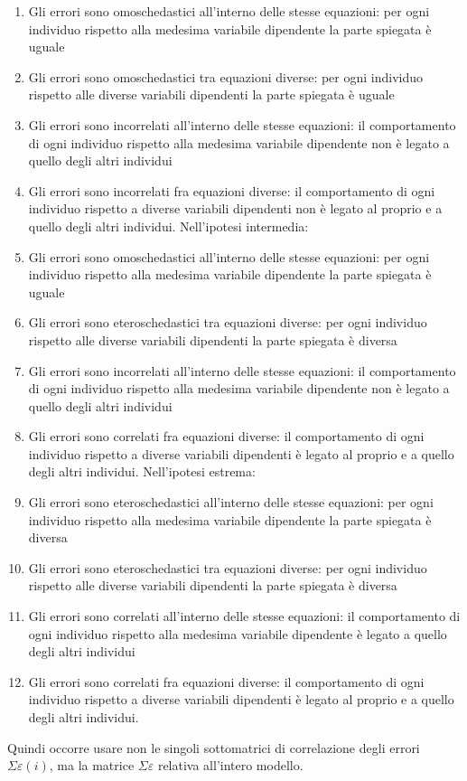 \documentclass[a4page, 11pt]{article}
\begin{document}
\begin{enumerate}[noitemsep]
\item Gli errori sono omoschedastici all’interno delle stesse equazioni: per ogni individuo rispetto alla medesima variabile dipendente la parte spiegata è uguale
\item Gli errori sono omoschedastici tra equazioni diverse: per ogni individuo rispetto alle diverse variabili dipendenti la parte spiegata è uguale
\item Gli errori sono incorrelati all’interno delle stesse equazioni: il comportamento di ogni individuo rispetto alla medesima variabile dipendente non è legato a quello degli altri individui
\item Gli errori sono incorrelati fra equazioni diverse: il comportamento di ogni individuo rispetto a diverse variabili dipendenti non è legato al proprio e a quello degli altri individui.
\newline
\newline
Nell’ipotesi intermedia:
\newline
\item Gli errori sono omoschedastici all’interno delle stesse equazioni: per ogni individuo rispetto alla medesima variabile dipendente la parte spiegata è uguale
\item Gli errori sono eteroschedastici tra equazioni diverse: per ogni individuo rispetto alle diverse variabili dipendenti la parte spiegata è diversa
\item Gli errori sono incorrelati all’interno delle stesse equazioni: il comportamento di ogni individuo rispetto alla medesima variabile dipendente non è legato a quello degli altri individui
\item Gli errori sono correlati fra equazioni diverse: il comportamento di ogni individuo rispetto a diverse variabili dipendenti è legato al proprio e a quello degli altri individui.
\newline
\newline
Nell’ipotesi estrema:
\newline
\item Gli errori sono eteroschedastici all’interno delle stesse equazioni: per ogni individuo rispetto alla medesima variabile dipendente la parte spiegata è diversa
\item Gli errori sono eteroschedastici tra equazioni diverse: per ogni individuo rispetto alle diverse variabili dipendenti la parte spiegata è diversa
\item Gli errori sono correlati all’interno delle stesse equazioni: il comportamento di ogni individuo rispetto alla medesima variabile dipendente è legato a quello degli altri individui
\item Gli errori sono correlati fra equazioni diverse: il comportamento di ogni individuo rispetto a diverse variabili dipendenti è legato al proprio e a quello degli altri individui.
\end{enumerate}
Quindi occorre usare non le singoli sottomatrici di correlazione degli errori $\Sigma\varepsilon(i)$, ma la matrice $\Sigma\varepsilon$ relativa all’intero modello.
\end{document}
